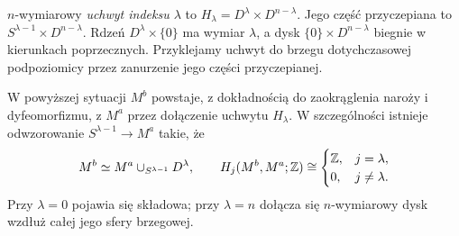 \begin{definicja}
\label{def:uchwyt-morse-17}
$n$-wymiarowy \emph{uchwyt indeksu $\lambda$}
to $H_\lambda=D^\lambda\times D^{n-\lambda}$.
Jego część przyczepiana to
$S^{\lambda-1}\times D^{n-\lambda}$.
Rdzeń $D^\lambda\times\{0\}$ ma
wymiar $\lambda$, a dysk
$\{0\}\times D^{n-\lambda}$ biegnie
w kierunkach poprzecznych.
Przyklejamy uchwyt do brzegu
dotychczasowej podpoziomicy
przez zanurzenie jego części przyczepianej.
\end{definicja}

\begin{twierdzenie}
\label{thm:uchwyt-morse-17}
W powyższej sytuacji $M^b$ powstaje,
z dokładnością do zaokrąglenia naroży
i dyfeomorfizmu, z $M^a$ przez
dołączenie uchwytu $H_\lambda$.
W szczególności istnieje odwzorowanie
$S^{\lambda-1}\to M^a$ takie, że
\begin{equation}\label{eq:komorka-morse-17}
 M^b\simeq M^a\cup_{S^{\lambda-1}}D^\lambda,
 \qquad
 H_j(M^b,M^a;\mathbb{Z})\cong
 \begin{cases}\mathbb{Z},&j=\lambda,\\0,&j\ne\lambda.
 \end{cases}
\end{equation}
Przy $\lambda=0$ pojawia się składowa;
przy $\lambda=n$ dołącza się
$n$-wymiarowy dysk wzdłuż całej
jego sfery brzegowej.
\end{twierdzenie}
